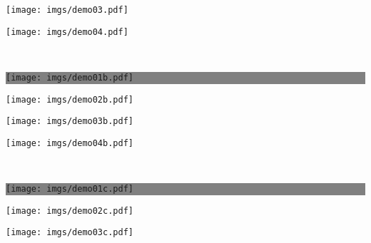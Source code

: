 \begin{figure*}[!ht]
{\begin{minipage}{\subw}
		  \centerline{
		  \texttt{[image: imgs/demo03.pdf]}
		  }
		\end{minipage}
	 }
	 \colorbox{myRed}{
		\begin{minipage}{\subw}
		  \centerline{
		  \texttt{[image: imgs/demo04.pdf]}
		  }
		\end{minipage}
	 }
	 \vspace{1mm}
	 \\
	 \colorbox{gray}{
		\begin{minipage}{\subw}
		  \centerline{
		  \texttt{[image: imgs/demo01b.pdf]}
		  }
		\end{minipage}
	 }
	 \hspace{3mm}
	 \colorbox{myGreen}{
		\begin{minipage}{\subw}
		  \centerline{
		  \texttt{[image: imgs/demo02b.pdf]}
		  }
		\end{minipage}
	 }
	 \colorbox{myRed}{
		\begin{minipage}{\subw}
		  \centerline{
		  \texttt{[image: imgs/demo03b.pdf]}
		  }
		\end{minipage}
	 }
	 \colorbox{myRed}{
		\begin{minipage}{\subw}
		  \centerline{
		  \texttt{[image: imgs/demo04b.pdf]}
		  }
		\end{minipage}
	 }
	 \vspace{1mm}
	 \\
	 \colorbox{gray}{
		\begin{minipage}{\subw}
		  \centerline{
		  \texttt{[image: imgs/demo01c.pdf]}
		  }
		\end{minipage}
	 }
	 \hspace{3mm}
	 \colorbox{myGreen}{
		\begin{minipage}{\subw}
		  \centerline{
		  \texttt{[image: imgs/demo02c.pdf]}
		  }
		\end{minipage}
	 }
	 \colorbox{myRed}{
		\begin{minipage}{\subw}
		  \centerline{
		  \texttt{[image: imgs/demo03c.pdf]}
		  }
		\end{minipage}
	 }
	 \colorbox{myRed}{
		\begin{minipage}{\subw}
		  \centerline{
}
\end{minipage}}
\end{figure*}
